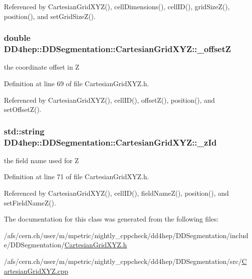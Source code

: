 Referenced by CartesianGridXYZ(), cellDimensions(), cellID(), gridSizeZ(), position(), and setGridSizeZ().\hypertarget{class_d_d4hep_1_1_d_d_segmentation_1_1_cartesian_grid_x_y_z_a1578ef683b88f0d4897c354885a488b8}{
\subsubsection[{\_\-offsetZ}]{\setlength{\rightskip}{0pt plus 5cm}double {\bf DD4hep::DDSegmentation::CartesianGridXYZ::\_\-offsetZ}}}
\label{class_d_d4hep_1_1_d_d_segmentation_1_1_cartesian_grid_x_y_z_a1578ef683b88f0d4897c354885a488b8}


the coordinate offset in Z 

Definition at line 69 of file CartesianGridXYZ.h.

Referenced by CartesianGridXYZ(), cellID(), offsetZ(), position(), and setOffsetZ().\hypertarget{class_d_d4hep_1_1_d_d_segmentation_1_1_cartesian_grid_x_y_z_ab6ef126016dd03434b814590c0ca64f9}{
\subsubsection[{\_\-zId}]{\setlength{\rightskip}{0pt plus 5cm}std::string {\bf DD4hep::DDSegmentation::CartesianGridXYZ::\_\-zId}}}
\label{class_d_d4hep_1_1_d_d_segmentation_1_1_cartesian_grid_x_y_z_ab6ef126016dd03434b814590c0ca64f9}


the field name used for Z 

Definition at line 71 of file CartesianGridXYZ.h.

Referenced by CartesianGridXYZ(), cellID(), fieldNameZ(), position(), and setFieldNameZ().

The documentation for this class was generated from the following files:\begin{DoxyCompactItemize}
\item 
/afs/cern.ch/user/m/mpetric/nightly\_\-cppcheck/dd4hep/DDSegmentation/include/DDSegmentation/\hyperlink{_d_d_segmentation_2include_2_d_d_segmentation_2_cartesian_grid_x_y_z_8h}{CartesianGridXYZ.h}\item 
/afs/cern.ch/user/m/mpetric/nightly\_\-cppcheck/dd4hep/DDSegmentation/src/\hyperlink{_d_d_segmentation_2src_2_cartesian_grid_x_y_z_8cpp}{CartesianGridXYZ.cpp}\end{DoxyCompactItemize}
